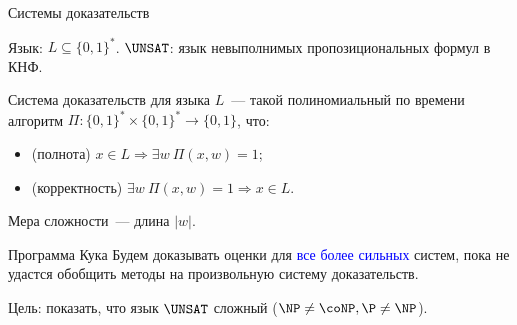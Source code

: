 \begin{frame}{Системы доказательств}

	Язык: $L \subseteq \{0, 1\}^*$. $\UNSAT$: язык невыполнимых пропозициональных формул в КНФ.
    \pause

    \begin{definition}
        Система доказательств для языка $L$~--- такой полиномиальный по времени алгоритм $\Pi\colon \{0,
        1\}^* \times \{0, 1\}^* \rightarrow \{0, 1\}$, что:
        \begin{itemize}
            \item (полнота) $x \in L \Rightarrow \exists w ~ \Pi(x, w) = 1$;
            \item (корректность) $\exists w ~ \Pi(x, w) = 1 \Rightarrow x \in L$.
        \end{itemize}
    \end{definition}

    Мера сложности~--- длина $|w|$.

    \pause

    \begin{block}{Программа Кука}
        Будем доказывать оценки для \textcolor{blue}{все более сильных} систем, пока не удастся обобщить
        методы на произвольную систему доказательств.

        Цель: показать, что язык $\UNSAT$ сложный ($\NP \neq \coNP, \P \neq \NP$).
    \end{block}

\end{frame}


